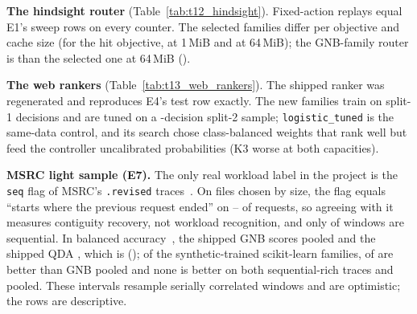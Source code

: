 

\textbf{The hindsight router} (Table~\ref{tab:t12_hindsight}). Fixed-action
replays equal E1's sweep rows on every counter. The selected families
differ per objective and cache size (for the hit objective,
\hsrCvBestHitOneMiB{} at 1\,MiB and \hsrCvBestHitSixtyFourMiB{} at 64\,MiB);
the GNB-family router is \decHsrSTwoHitRatioRoutedHitGnbVsRoutedHitSixtyFourMiBVerdict{}
than the selected one at 64\,MiB
(\decHsrSTwoHitRatioRoutedHitGnbVsRoutedHitSixtyFourMiBPairedCI).



\textbf{The web rankers} (Table~\ref{tab:t13_web_rankers}). The shipped ranker
was regenerated and reproduces E4's test row exactly. The new families train on
\wrkTrainDecisions{} split-1 decisions and are tuned on a
\wrkTuneDecisions-decision split-2 sample; \texttt{logistic\_tuned} is the
same-data control, and its search chose class-balanced weights that rank well
but feed the controller uncalibrated probabilities (K3 worse at both
capacities).



\textbf{MSRC light sample (E7).} The only real workload label in the project
is the \texttt{seq} flag of MSRC's \texttt{.revised} traces~\cite{narayanan2008write}.
On \msrcTraces{} files chosen by size, the flag equals ``starts where the
previous request ended'' on \msrcFlagContiguityMin--\msrcFlagContiguityMax{} of
requests, so agreeing with it measures contiguity recovery, not workload
recognition, and only \msrcSeqWindows{} of \msrcWindows{} windows are
sequential. In balanced accuracy~\cite{brodersen2010balanced}, the shipped GNB
scores \msrcBalAccShippedSyntheticGnbPooled{} pooled and the shipped QDA
\msrcBalAccShippedSyntheticQdaPooled{}, which is
\decMsrcMOneShippedSyntheticQdaPooledVerdict{}
(\decMsrcMOneShippedSyntheticQdaPooledCI); of the synthetic-trained scikit-learn
families, \decTallyMOneSklearnSyntheticPooledBetter{} of
\decTallyMOneSklearnSyntheticPooled{} are better than GNB pooled and none is
better on both sequential-rich traces and pooled. These intervals resample
serially correlated windows and are optimistic; the rows are descriptive.
